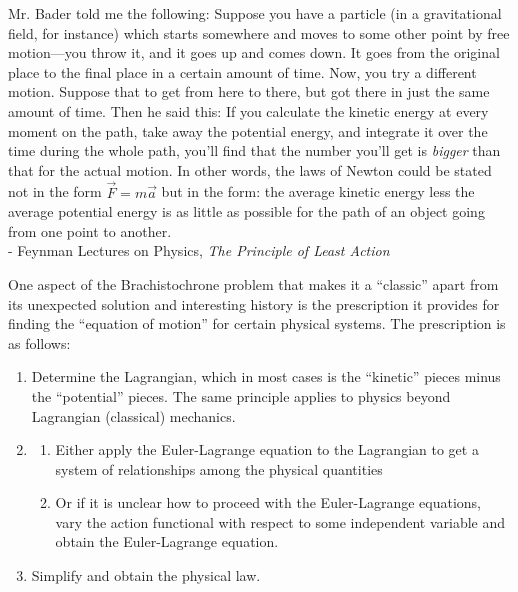 \documentclass{article}
\begin{document}
\begin{displayquote}
	Mr. Bader told me the following: Suppose you have a particle (in a gravitational field, for instance) which starts somewhere and moves to some other point by free motion—you throw it, and it goes up and comes down. It goes from the original place to the final place in a certain amount of time. Now, you try a different motion. Suppose that to get from here to there, but got there in just the same amount of time. Then he said this: If you calculate the kinetic energy at every moment on the path, take away the potential energy, and integrate it over the time during the whole path, you’ll find that the number you’ll get is \textit{bigger} than that for the actual motion. In other words, the laws of Newton could be stated not in the form $\vec{F}=m\vec{a}$ but in the form: the average kinetic energy less the average potential energy is as little as possible for the path of an object going from one point to another. \\
	- Feynman Lectures on Physics, \textit{The Principle of Least Action}\cite{FEYN}
\end{displayquote}

One aspect of the Brachistochrone problem that makes it a ``classic'' apart from its unexpected solution and interesting history is the prescription it provides for finding the ``equation of motion'' for certain physical systems. The prescription is as follows:
\begin{enumerate}
	\item Determine the Lagrangian, which in most cases is the ``kinetic'' pieces minus the ``potential'' pieces. The same principle applies to physics beyond Lagrangian (classical) mechanics. 
	\item \begin{enumerate}
		\item Either apply the Euler-Lagrange equation to the Lagrangian to get a system of relationships among the physical quantities
		\item Or if it is unclear how to proceed with the Euler-Lagrange equations, vary the action functional with respect to some independent variable and obtain the Euler-Lagrange equation. 
	\end{enumerate}
	\item Simplify and obtain the physical law. 
\end{enumerate}
\end{document}

